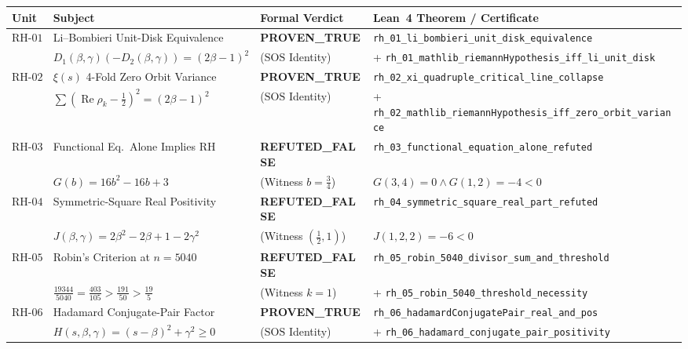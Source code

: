 \documentclass[11pt,a4paper]{article}
\theoremstyle{plain}
\theoremstyle{definition}
\theoremstyle{remark}
\DeclareMathOperator{\RePart}{Re}
\begin{document}
\begin{table}[htbp]
\centering
\small
\begin{tabular}{@{}llll@{}}
\toprule
\textbf{Unit} & \textbf{Subject} & \textbf{Formal Verdict} & \textbf{Lean~4 Theorem / Certificate} \\
\midrule
$\mathrm{RH\text{-}01}$ & Li--Bombieri Unit-Disk Equivalence & \textbf{PROVEN\_TRUE} & \texttt{rh\_01\_li\_bombieri\_unit\_disk\_equivalence} \\
                        & $D_1(\beta,\gamma)(-D_2(\beta,\gamma)) = (2\beta-1)^2$ & ($\mathrm{SOS}$ Identity) & + \texttt{rh\_01\_mathlib\_riemannHypothesis\_iff\_li\_unit\_disk} \\
$\mathrm{RH\text{-}02}$ & $\xi(s)$ 4-Fold Zero Orbit Variance & \textbf{PROVEN\_TRUE} & \texttt{rh\_02\_xi\_quadruple\_critical\_line\_collapse} \\
                        & $\sum (\RePart \rho_k - \frac{1}{2})^2 = (2\beta-1)^2$ & ($\mathrm{SOS}$ Identity) & + \texttt{rh\_02\_mathlib\_riemannHypothesis\_iff\_zero\_orbit\_variance} \\
$\mathrm{RH\text{-}03}$ & Functional Eq.\ Alone Implies RH & \textbf{REFUTED\_FALSE} & \texttt{rh\_03\_functional\_equation\_alone\_refuted} \\
                        & $G(b) = 16b^2 - 16b + 3$ & (Witness $b = \frac{3}{4}$) & $G(3,4) = 0 \land G(1,2) = -4 < 0$ \\
$\mathrm{RH\text{-}04}$ & Symmetric-Square Real Positivity & \textbf{REFUTED\_FALSE} & \texttt{rh\_04\_symmetric\_square\_real\_part\_refuted} \\
                        & $J(\beta,\gamma) = 2\beta^2 - 2\beta + 1 - 2\gamma^2$ & (Witness $(\frac{1}{2}, 1)$) & $J(1,2,2) = -6 < 0$ \\
$\mathrm{RH\text{-}05}$ & Robin's Criterion at $n = 5040$ & \textbf{REFUTED\_FALSE} & \texttt{rh\_05\_robin\_5040\_divisor\_sum\_and\_threshold} \\
                        & $\frac{19344}{5040}=\frac{403}{105}>\frac{191}{50}>\frac{19}{5}$ & (Witness $k = 1$) & + \texttt{rh\_05\_robin\_5040\_threshold\_necessity} \\
$\mathrm{RH\text{-}06}$ & Hadamard Conjugate-Pair Factor & \textbf{PROVEN\_TRUE} & \texttt{rh\_06\_hadamardConjugatePair\_real\_and\_pos} \\
                        & $H(s,\beta,\gamma) = (s-\beta)^2 + \gamma^2 \ge 0$ & ($\mathrm{SOS}$ Identity) & + \texttt{rh\_06\_hadamard\_conjugate\_pair\_positivity} \\

\end{tabular}
\end{table}
\end{document}

